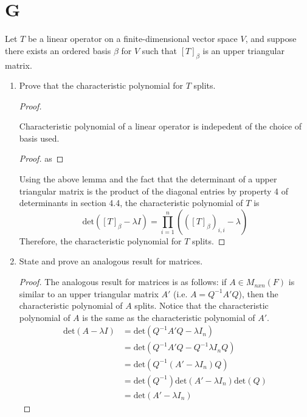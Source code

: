 \documentclass[11pt]{scrartcl}
\begin{document}
\section{G}
Let $T$ be a linear operator on a finite-dimensional vector space $V$, and suppose there exists an ordered basis $\beta$ for
$V$ such that $[T]_\beta$ is an upper triangular matrix.
\begin{enumerate}[label=\alph*.]
	\item{
	      Prove that the characteristic polynomial for $T$ splits.
	      \begin{proof}
		      \begin{lemma}
			      Characteristic polynomial of a linear operator is indepedent of the choice of basis used.
			      \begin{proof}
				      as
			      \end{proof}
		      \end{lemma}
		      Using the above lemma and the fact that the determinant of a upper triangular matrix is the product of
		      the diagonal entries by property 4 of determinants in section 4.4, the characteristic polynomial of $T$ is
		      \[
			      \text{det}([T]_\beta - \lambda I) = \prod_{i=1}^{n}(([T]_\beta)_{i,i} - \lambda)
		      \]
		      Therefore, the characteristic polynomial for $T$ splits.
	      \end{proof}
	      }
	\item{
	      State and prove an analogous result for matrices.
	      \begin{proof}
		      The analogous result for matrices is as follows: if $A \in M_{nxn}(F)$ is similar to an upper triangular matrix $A'$
		      (i.e. $A=Q^{-1}A'Q$),
		      then the characteristic polynomial of $A$ splits.
		      Notice that the characteristic polynomial of $A$ is the same as the characteristic polynomial of $A'$.
		      \begin{align*}
			      \text{det}(A - \lambda I) & = \text{det}(Q^{-1}A'Q - \lambda I_n)                          \\
			                                & = \text{det}(Q^{-1}A'Q - Q^{-1}\lambda I_nQ)                   \\
			                                & = \text{det}(Q^{-1}(A' - \lambda I_n)Q)                        \\
			                                & = \text{det}(Q^{-1}) \text{det}(A' - \lambda I_n)\text{det}(Q) \\
			                                & = \text{det}(A' - \lambda I_n)

\end{align*}
\end{proof}}
\end{enumerate}
\end{document}
